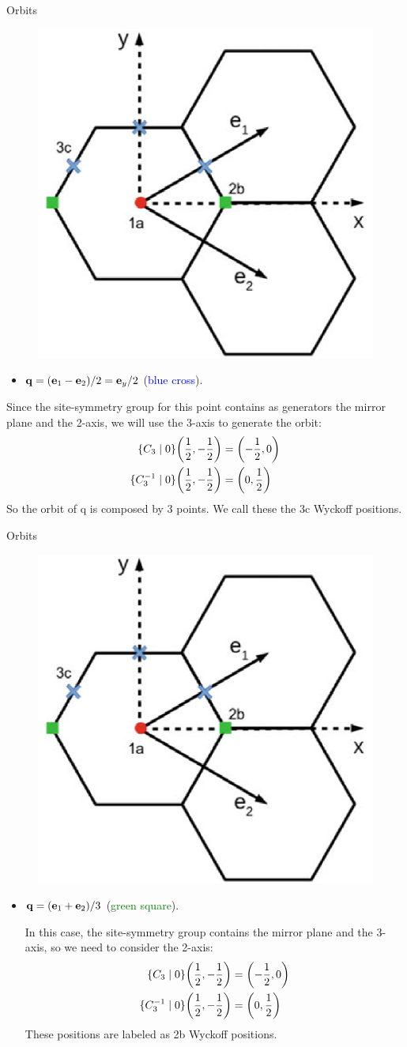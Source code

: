 \documentclass[10pt,aspectratio=169,xcolor={table,dvipsnames}]{beamer}
\begin{document}
\begin{frame}{Orbits}
\begin{figure}[H]
\centering
\includegraphics[width=0.22\linewidth]{fig/wyckoff_pos.png}
\end{figure}

\begin{itemize}
\item ${\vb{q}} = ({\vb{e}}_1-{\vb{e}}_2)/2 = {\vb{e}}_y/2$ (\textcolor{blue}{blue cross}).
\end{itemize}

Since the site-symmetry group for this point contains as generators the mirror plane and the 2-axis, we will use the 3-axis to generate the orbit:
\begin{align*}
\{C_3 \mid 0\} \qty(\frac{1}{2},-\frac{1}{2}) &= \qty(-\frac{1}{2},0)
\\
\{C_3^{-1} \mid 0\} \qty(\frac{1}{2},-\frac{1}{2}) &= \qty(0,\frac{1}{2})
\end{align*}
So the orbit of q is composed by 3 points. We call these the 3c Wyckoff positions.
\end{frame}


\begin{frame}{Orbits}
\begin{figure}[H]
\centering
\includegraphics[width=0.22\linewidth]{fig/wyckoff_pos.png}
\end{figure}

\begin{itemize}
\item ${\vb{q}} = ({\vb{e}}_1 + {\vb{e}}_2) / 3$ (\textcolor{green}{green square}).

In this case, the site-symmetry group contains the mirror plane and the 3-axis, so we need to consider the 2-axis:
\begin{align*}
\{C_3 \mid 0\} \qty(\frac{1}{2},-\frac{1}{2}) &= \qty(-\frac{1}{2},0)
\\
\{C_3^{-1} \mid 0\} \qty(\frac{1}{2},-\frac{1}{2}) &= \qty(0,\frac{1}{2})
\end{align*}
These positions are labeled as 2b Wyckoff positions.
\end{itemize}
\end{frame}
\end{document}
